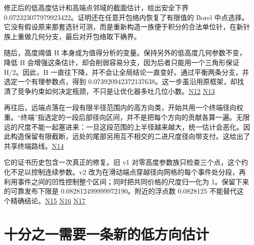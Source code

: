 修正后的低高度估计和高端点邻域的截面估计，给出安全下界 \allowbreak{}0.072323077979923422。证明还在任意开包络内恢复了有限值的 Borel 中点选择。它没有假设原来那套选针可测，而是重新构造一族便于积分的合法单位针，在新针族上重做几何分支，最后对开包络取下确界。

随后，高度阈值 H 本身成为值得分析的变量。保持另外的低高度几何参数不变，降低 H 会增强这条估计，却会削弱容易分支，因为后者只能用一个三角形保证 H/2。因此，H 一直往下降，并不会让全局结论一直变好。通过平衡两条分支，并选定一个有理参数点，得到 \allowbreak{}0.073920942372137638。这一步虽沿用原框架，却找清了竞争约束如何决定瓶颈，不只是让优化器多吐几位小数。\href{https://github.com/subfish-zhou/star-shaped-kakeya-lean/blob/6432d8eb33cc2093ed5ca1f5e63390e4bf065fd0/history/radial-H-fixed-point/CERTIFIED.md}{N12} \href{https://github.com/subfish-zhou/star-shaped-kakeya-lean/blob/6432d8eb33cc2093ed5ca1f5e63390e4bf065fd0/history/radial-H-fixed-point/radial_H_monotonicity_and_certificate_zh.md}{N13}

再往后，远端点落在一段有限半径范围内的高方向类，开始共用一个终端径向权重。``终端''指选定的一段后部径向区间，并不是把每个方向的贡献各算一遍。无限远的尺度不能一起塞进来：一旦这段范围的上半径越来越大，统一估计会恶化。因此构造保留有限截断，远处的尾部另用互不相交的二进尺度径向带支付。这给出了共享终端路线。\href{https://github.com/subfish-zhou/star-shaped-kakeya-lean/blob/6432d8eb33cc2093ed5ca1f5e63390e4bf065fd0/history/shared-terminal-082812/class_independent_terminal_price_report_zh.md}{N14}

它的证书历史包含一次真正的修复。旧 v1 对零高度参数族只检查三个点，这个约化不足以控制连续参数。v2 改为在滑动端点穿越径向网格的每个事件处分段，再利用事件之间的凹性控制整个区间；同时把共同价格的尺度归一化为 1。保留下来的可靠发布下限是 \allowbreak{}0.082812499999972190。附近的浮点数 \allowbreak{}0.0828125 不能替代这个精确结论。\href{https://github.com/subfish-zhou/star-shaped-kakeya-lean/blob/6432d8eb33cc2093ed5ca1f5e63390e4bf065fd0/history/shared-terminal-082812/class_independent_terminal_strict_report_zh.md}{N15} \href{https://github.com/subfish-zhou/star-shaped-kakeya-lean/blob/6432d8eb33cc2093ed5ca1f5e63390e4bf065fd0/history/shared-terminal-082812/class_independent_terminal_strict_report_v2.md}{N16} \href{https://github.com/subfish-zhou/star-shaped-kakeya-lean/blob/6432d8eb33cc2093ed5ca1f5e63390e4bf065fd0/history/shared-terminal-082812/CERTIFIED_PROMOTION.md}{N17}

\section{十分之一需要一条新的低方向估计}\label{ux5341ux5206ux4e4bux4e00ux9700ux8981ux4e00ux6761ux65b0ux7684ux4f4eux65b9ux5411ux4f30ux8ba1}


